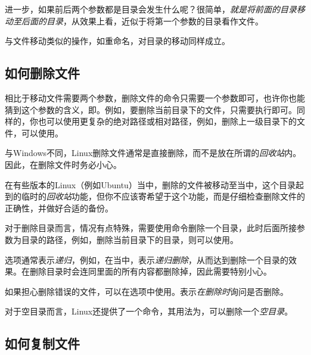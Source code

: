 进一步，如果前后两个参数都是目录会发生什么呢？很简单，\emph{就是将前面的目录移动至后面的目录}，从效果上看，近似于将第一个参数的目录看作文件。

\begin{attention}
    与文件移动类似的操作，如重命名，对目录的移动同样成立。
\end{attention}

\subsection{如何删除文件}\label{subsec:文件操作-如何删除文件}

相比于移动文件需要两个参数，删除文件的命令只需要一个参数即可，也许你也能猜到这个参数的含义，即。例如，要删除当前目录下的文件，只需要执行即可。同样的，你也可以使用更复杂的绝对路径或相对路径，例如，删除上一级目录下的文件，可以使用。

\begin{extend}
    与Windows不同，Linux删除文件通常是直接删除，而不是放在所谓的\emph{回收站}内。因此，在删除文件时务必小心。

    在有些版本的Linux（例如Ubuntu）当中，删除的文件被移动至当中，这个目录起到的临时的\emph{回收站}功能，但你不应该寄希望于这个功能，而是仔细检查删除文件的正确性，并做好合适的备份。
\end{extend}

对于删除目录而言，情况有点特殊，需要使用命令删除一个目录，此时后面所接参数为目录的路径，例如，删除当前目录下的目录，则可以使用。

\begin{attention}
    选项通常表示\emph{递归}，例如，在当中，表示\emph{递归删除}，从而达到删除一个目录的效果。在删除目录时会连同里面的所有内容都删除掉，因此需要特别小心。

    如果担心删除错误的文件，可以在选项中使用。表示\emph{在删除时}询问是否删除。

    对于空目录而言，Linux还提供了一个命令，其用法为，可以删除一个\emph{空目录}。
\end{attention}

\subsection{如何复制文件}\label{subsec:文件操作-如何复制文件}

